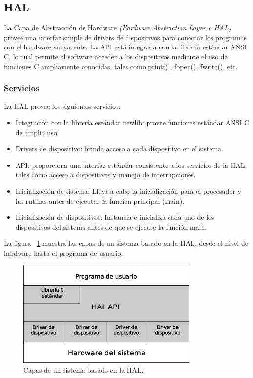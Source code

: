 \subsection {HAL}

La Capa de Abstracción de Hardware \textit{(Hardware Abstraction Layer o HAL)} provee una interfaz simple de drivers de dispositivos para conectar los programas con el hardware subyacente. La API está integrada con la librería estándar ANSI C, lo cual permite al software acceder a los dispositivos mediante el uso de funciones C ampliamente conocidas, tales como printf(), fopen(), fwrite(), etc.

\subsubsection{Servicios}

La HAL provee los siguientes servicios:

\begin{itemize}
	\item Integración con la librería estándar newlib: provee funciones estándar ANSI C de amplio uso.
	\item Drivers de dispositivo: brinda acceso a cada dispositivo en el sistema.
	\item API: proporciona una interfaz estándar consistente a los servicios de la HAL, tales como acceso a dispositivos y manejo de interrupciones.
	\item Inicialización de sistema: Lleva a cabo la inicialización para el procesador y las rutinas antes de ejecutar la función principal (main).
	\item Inicialización de dispositivos: Instancia e inicializa cada uno de los dispositivos del sistema antes de que se ejecute la función main.
\end{itemize}

La figura ~\ref{fig:hal} muestra las capas de un sistema basado en la HAL, desde el nivel de hardware hasta el programa de usuario.

\begin{figure}[H]
  \centering
	\includegraphics[width=0.80\textwidth]{3-arquitectura/graf/hal.eps}
  \caption{Capas de un sistema basado en la HAL.}
  \label{fig:hal}
\end{figure}

